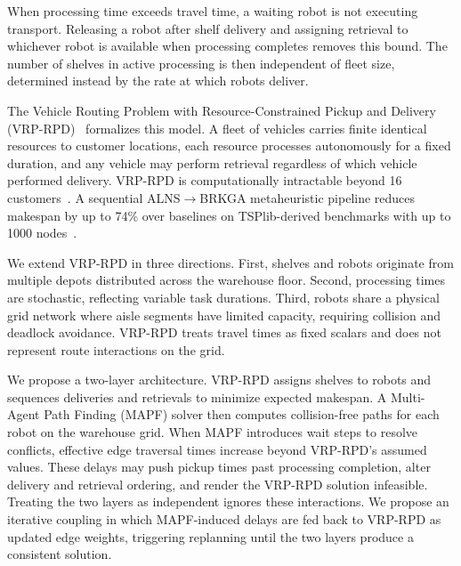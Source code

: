 \documentclass{article}
\begin{document}
When processing time exceeds travel time, a waiting robot is not executing
transport. Releasing a robot after shelf delivery and assigning retrieval to
whichever robot is available when processing completes removes this bound. The
number of shelves in active processing is then independent of fleet size,
determined instead by the rate at which robots deliver.

The Vehicle Routing Problem with Resource-Constrained Pickup and Delivery
(VRP-RPD)~\cite{vrp_rpd_gecco_2026} formalizes this model. A fleet of vehicles
carries finite identical resources to customer locations, each resource processes
autonomously for a fixed duration, and any vehicle may perform retrieval
regardless of which vehicle performed delivery. VRP-RPD is computationally
intractable beyond 16 customers~\cite{vrp_rpd_gecco_2026}. A sequential
ALNS$\to$BRKGA metaheuristic pipeline reduces makespan by up to 74\% over
baselines on TSPlib-derived benchmarks with up to 1000 nodes~\cite{vrp_rpd_gecco_2026}.

We extend VRP-RPD in three directions. First, shelves and robots originate from
multiple depots distributed across the warehouse floor. Second, processing times
are stochastic, reflecting variable task durations. Third, robots share a
physical grid network where aisle segments have limited capacity, requiring
collision and deadlock avoidance. VRP-RPD treats travel times as fixed scalars
and does not represent route interactions on the grid.

We propose a two-layer architecture. VRP-RPD assigns shelves to robots and
sequences deliveries and retrievals to minimize expected makespan. A
Multi-Agent Path Finding (MAPF) solver then computes collision-free paths for
each robot on the warehouse grid. When MAPF introduces wait steps to resolve
conflicts, effective edge traversal times increase beyond VRP-RPD's assumed
values. These delays may push pickup times past processing completion, alter
delivery and retrieval ordering, and render the VRP-RPD solution infeasible.
Treating the two layers as independent ignores these interactions. We propose an
iterative coupling in which MAPF-induced delays are fed back to VRP-RPD as
updated edge weights, triggering replanning until the two layers produce a
consistent solution.
\end{document}

